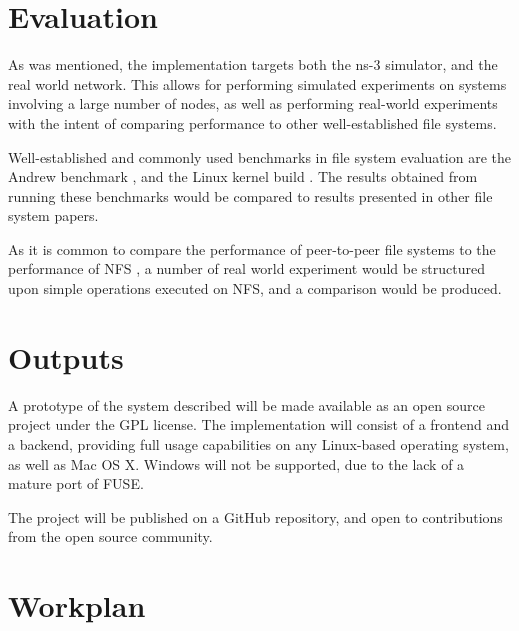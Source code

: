\documentclass[8pt,a4paper]{article}
\begin{document}
\section{Evaluation}

As was mentioned, the implementation targets both the ns-3 \cite{ns3} simulator, and the real world network. This allows for performing simulated experiments on systems involving a large number of nodes, as well as performing real-world experiments with the intent of comparing performance to other well-established file systems.

Well-established and commonly used benchmarks in file system evaluation are the Andrew benchmark \cite{andrew}, and the Linux kernel build \cite{kernelb}. The results obtained from running these benchmarks would be compared to results presented in other file system papers.

As it is common to compare the performance of peer-to-peer file systems to the performance of NFS \cite{pastis} \cite{ivy} \cite{oceanstore}, a number of real world experiment would be structured upon simple operations executed on NFS, and a comparison would be produced.

\section{Outputs}

A prototype of the system described will be made available as an open source project under the GPL \cite{gpl} license. The implementation will consist of a frontend and a backend, providing full usage capabilities on any Linux-based operating system, as well as Mac OS X. Windows will not be supported, due to the lack of a mature port of FUSE. 

The project will be published on a GitHub \cite{github} repository, and open to contributions from the open source community.

\section{Workplan}

\end{document}
